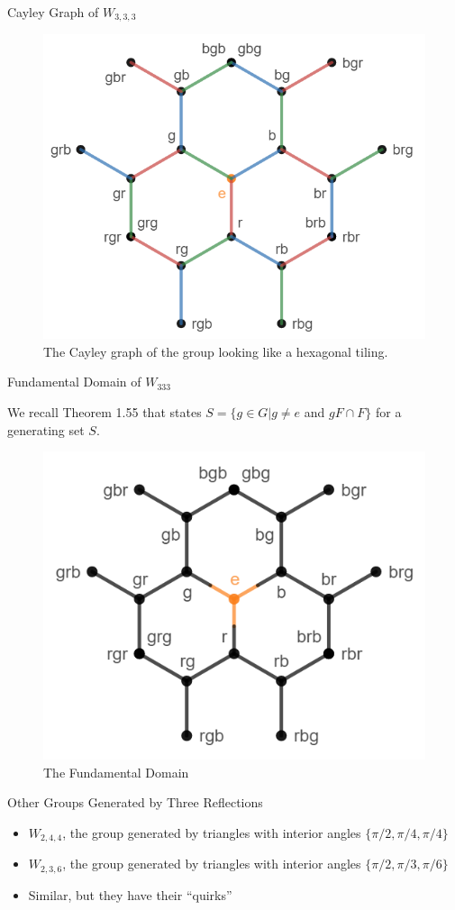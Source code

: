 \documentclass[usenames,dvipsnames]{beamer}
\begin{document}
\begin{frame}{Cayley Graph of $W_{3,3,3}$}
\begin{figure}[h]
    \centering
    \includegraphics[width=.6\textwidth]{images/6-06-rbg_rbg_3-cayley.png}
    \caption{The Cayley graph of the group looking like a hexagonal tiling.}
\end{figure}

\end{frame}

\begin{frame}{Fundamental Domain of $W_{333}$}

We recall Theorem 1.55 that states $S=\{g\in G | g \ne e$ and $gF \cap F\}$ for a generating set $S$.

\pause{}

\begin{figure}[h]
    \centering
    \includegraphics[width=.5\textwidth]{images/6-07-rbg_rbg_3-fundamental_domain.png}
    \caption{The Fundamental Domain}
\end{figure}

\end{frame}

\begin{frame}{Other Groups Generated by Three Reflections}

\begin{itemize}
  \item $W_{2,4,4}$, the group generated by triangles with interior angles $\{\pi/2,\pi/4,\pi/4\}$
  \item $W_{2,3,6}$, the group generated by triangles with interior angles $\{\pi/2,\pi/3,\pi/6\}$
  \item Similar, but they have their ``quirks''
\end{itemize}

\end{frame}
\end{document}
